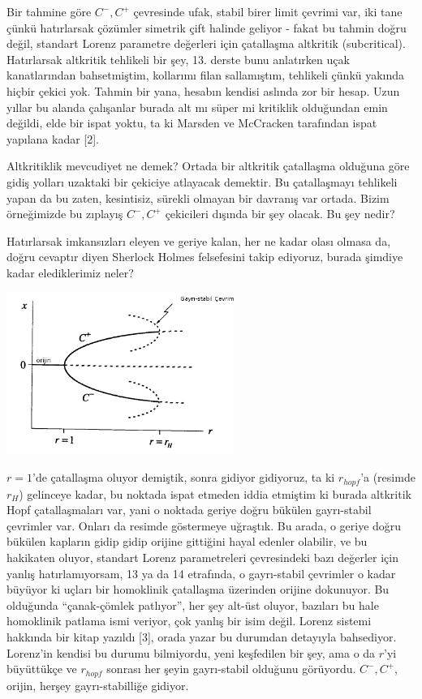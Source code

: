 \documentclass[12pt,fleqn]{article}\usepackage{../../common}
\begin{document}
Bir tahmine göre $C^-,C^+$ çevresinde ufak, stabil birer limit çevrimi var,
iki tane çünkü hatırlarsak çözümler simetrik çift halinde geliyor - fakat
bu tahmin doğru değil, standart Lorenz parametre değerleri için çatallaşma
altkritik (subcritical). Hatırlarsak altkritik tehlikeli bir şey,
13. derste bunu anlatırken uçak kanatlarından bahsetmiştim, kollarımı filan
sallamıştım, tehlikeli çünkü yakında hiçbir çekici yok. Tahmin bir yana,
hesabın kendisi aslında zor bir hesap. Uzun yıllar bu alanda çalışanlar
burada alt mı süper mi kritiklik olduğundan emin değildi, elde bir ispat
yoktu, ta ki Marsden ve McCracken tarafından ispat yapılana kadar [2].

Altkritiklik mevcudiyet ne demek? Ortada bir altkritik çatallaşma olduğuna
göre gidiş yolları uzaktaki bir çekiciye atlayacak demektir. Bu
çatallaşmayı tehlikeli yapan da bu zaten, kesintisiz, sürekli olmayan bir
davranış var ortada. Bizim örneğimizde bu zıplayış $C^-,C^+$ çekicileri
dışında bir şey olacak. Bu şey nedir?

Hatırlarsak imkansızları eleyen ve geriye kalan, her ne kadar olası olmasa
da, doğru cevaptır diyen Sherlock Holmes felsefesini takip ediyoruz, burada
şimdiye kadar elediklerimiz neler?

\includegraphics[width=20em]{17_04.png}

$r=1$'de çatallaşma oluyor demiştik, sonra gidiyor gidiyoruz, ta ki
$r_{hopf}$'a (resimde $r_H$) gelinceye kadar, bu noktada ispat etmeden
iddia etmiştim ki burada altkritik Hopf çatallaşmaları var, yani o noktada
geriye doğru bükülen gayrı-stabil çevrimler var. Onları da resimde
göstermeye uğraştık. Bu arada, o geriye doğru bükülen kapların gidip gidip
orijine gittiğini hayal edenler olabilir, ve bu hakikaten oluyor, standart
Lorenz parametreleri çevresindeki bazı değerler için yanlış
hatırlamıyorsam, 13 ya da 14 etrafında, o gayrı-stabil çevrimler o kadar
büyüyor ki uçları bir homoklinik çatallaşma üzerinden orijine dokunuyor. Bu
olduğunda ``çanak-çömlek patlıyor'', her şey alt-üst oluyor, bazıları bu
hale homoklinik patlama ismi veriyor, çok yanlış bir isim değil. Lorenz
sistemi hakkında bir kitap yazıldı [3], orada yazar bu durumdan detayıyla
bahsediyor. Lorenz'in kendisi bu durumu bilmiyordu, yeni keşfedilen bir
şey, ama o da $r$'yi büyüttükçe ve $r_{hopf}$ sonrası her şeyin
gayrı-stabil olduğunu görüyordu. $C^-,C^+$, orijin, herşey gayrı-stabilliğe
gidiyor.
\end{document}
